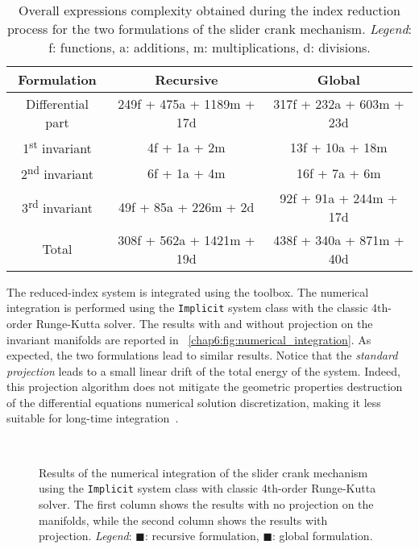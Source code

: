 \begin{table}[ht!]
    \centering
    \caption{Overall expressions complexity obtained during the index reduction process for the two formulations of the slider crank mechanism. \emph{Legend}: f: functions, a: additions, m: multiplications, d: divisions.}
    \label{chap6:chap6:tab:index_reduction}
    \begin{tabular}{c@{\hskip 5mm}c@{\hskip 5mm}c}
        \toprule
        \textbf{Formulation}  & \textbf{Recursive} & \textbf{Global} \\
        \midrule
        Differential part               & 249f + 475a  + 1189m + 17d & 317f + 232a + 603m + 23d \\
        1\textsuperscript{st} invariant & 4f   + 1a    + 2m          & 13f  + 10a  + 18m \\
        2\textsuperscript{nd} invariant & 6f   + 1a    + 4m          & 16f  + 7a   + 6m \\
        3\textsuperscript{rd} invariant & 49f  + 85a   + 226m + 2d   & 92f  + 91a  + 244m + 17d \\
        \midrule
        Total                           & 308f + 562a + 1421m + 19d  & 438f + 340a + 871m + 40d \\
        \bottomrule
    \end{tabular}
\end{table}

The reduced-index system is integrated using the \Indigo{} \Matlab{} toolbox. The numerical integration is performed using the \texttt{Implicit} system class with the classic 4th-order Runge-Kutta solver. The results with and without projection on the invariant manifolds are reported in \figurename~\ref{chap6:fig:numerical_integration}. As expected, the two formulations lead to similar results. Notice that the \emph{standard projection} leads to a small linear drift of the total energy of the system. Indeed, this projection algorithm does not mitigate the geometric properties destruction of the differential equations numerical solution discretization, making it less suitable for long-time integration~\cite{hairer2000symmetric}.

\begin{figure}[ht!]
    \centering
    \hfill
    \vspace*{-0.0pt}
    \hspace*{1.5pt} \\
    \hfill
    \caption{Results of the numerical integration of the slider crank mechanism using the \texttt{Implicit} system class with classic 4th-order Runge-Kutta solver. The first column shows the results with no projection on the manifolds, while the second column shows the results with projection. \emph{Legend}: {\color{mycolor1}$\blacksquare$}: recursive formulation, {\color{mycolor2}$\blacksquare$}: global formulation.}
    \label{chap6:chap6:fig:numerical_integration}
\end{figure}

